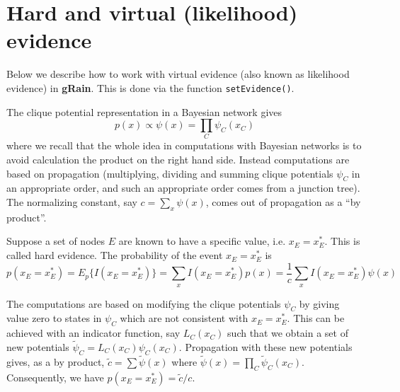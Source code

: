 \documentclass[10pt]{article}\usepackage[]{graphicx}\usepackage[]{color}
\def\grbn{{\bf gRain}}
\def\code#1{{\texttt{#1}}}
\begin{document}

\section{Hard  and virtual (likelihood) evidence}
\label{sec:hard-virt-likel}

Below we describe  how to work with virtual evidence (also known
as likelihood evidence) in \grbn. This is done via the function
\code{setEvidence()}.

The clique potential representation in a Bayesian network gives
\begin{displaymath}
  p(x) \propto \psi(x) = \prod_{C} \psi_C(x_C)
\end{displaymath}
where we recall that the whole idea in computations with Bayesian
networks is to avoid calculation the product on the right hand
side. Instead computations are based on propagation (multiplying,
dividing and summing clique potentials $\psi_C$ in an appropriate
order, and such an appropriate order comes from a junction tree).
The normalizing constant, say $c=\sum_x \psi(x)$, comes out of
propagation as a ``by product''.

Suppose a set of nodes $E$ are known to have a specific value,
i.e. $x_E=x^*_E$. This is called hard evidence. The probability of
the event $x_E=x^*_E$ is
\begin{displaymath}
  p(x_E=x^*_E)=E_p\{I(x_E=x^*_E)\} = \sum_x I(x_E=x^*_E) p(x)
  = \frac{1}{c} \sum_x I(x_E=x^*_E) \psi(x)
\end{displaymath}

The computations are based on modifying the clique potentials $\psi_C$
by giving value zero to states in $\psi_C$ which are not consistent
with $x_E=x^*_E$. This can be achieved with an indicator function, say
$L_C(x_C)$ such that we obtain a set of new potentials $\tilde \psi_C
= L_C(x_C) \psi_C(x_C)$. Propagation with these new potentials gives,
as a by product, $\tilde c=\sum \tilde \psi(x)$ where
$\tilde\psi(x)= \prod_C \tilde\psi_C(x_C)$. Consequently, we have
$p(x_E=x^*_E)=\tilde c / c$.
\end{document}
